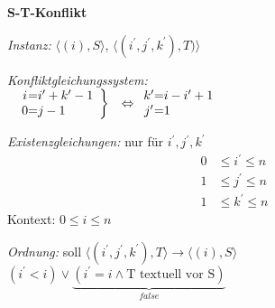 \textbf{S-T-Konflikt}\\
\begin{\itemize}
    \item \textit{Instanz:} $\langle (i), S \rangle$, $\langle (i^\prime, j^\prime, k^\prime), T) \rangle$

    \item \textit{Konfliktgleichungssystem:} \\
        $\begin{array}{cc}
        \left.
        \begin{array}{c@= l}
            i & i^\prime + k^\prime-1\\
            0 & j-1
        \end{array} \right\} & \Leftrightarrow
        \begin{array}{c@= l}
            k^\prime & i-i^\prime +1 \\
            j^\prime & 1
        \end{array}
        \end{array}$

        
    \item \textit{Existenzgleichungen:} nur für $i^\prime, j^\prime, k^\prime$\\
        \begin{align*}
        0 &\leq i^\prime \leq n \\
        1 &\leq j^\prime \leq n \\
        1 &\leq k^\prime \leq n
        \end{align*}
        Kontext: $0 \leq i \leq n$
    \item \textit{Ordnung:} soll $\langle ( i^\prime, j^\prime, k^\prime), T \rangle \rightarrow \langle (i), S \rangle$\\

    $(i^\prime < i) \lor \underbrace{(i^\prime = i \land \text{T textuell vor S})}_{false}$



\end{\itemize}
